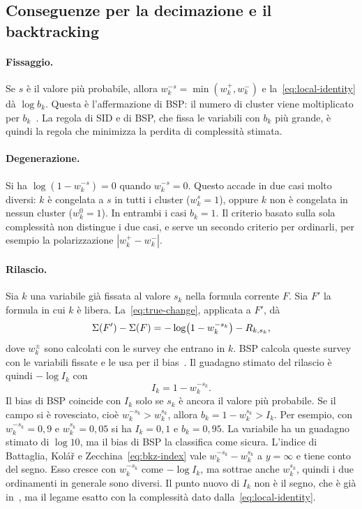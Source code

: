 \subsection{Conseguenze per la decimazione e il backtracking}

\paragraph{Fissaggio.}
Se $s$ è il valore più probabile, allora $w_k^{-s}=\min(w_k^+,w_k^-)$ e la~\eqref{eq:local-identity} dà $\log b_k$.
Questa è l'affermazione di BSP: il numero di cluster viene moltiplicato per $b_k$~\citep{marino2016bsp}.
La regola di SID e di BSP, che fissa le variabili con $b_k$ più grande, è quindi la regola che minimizza la perdita di complessità stimata.

\paragraph{Degenerazione.}
Si ha $\log(1-w_k^{-s})=0$ quando $w_k^{-s}=0$.
Questo accade in due casi molto diversi: $k$ è congelata a $s$ in tutti i cluster ($w_k^{s}=1$), oppure $k$ non è congelata in nessun cluster ($w_k^0=1$).
In entrambi i casi $b_k=1$.
Il criterio basato sulla sola complessità non distingue i due casi, e serve un secondo criterio per ordinarli, per esempio la polarizzazione $|w_k^+-w_k^-|$.

\paragraph{Rilascio.}
Sia $k$ una variabile già fissata al valore $s_k$ nella formula corrente $F$.
Sia $F'$ la formula in cui $k$ è libera.
La~\eqref{eq:true-change}, applicata a $F'$, dà
\begin{equation}
\Sigma(F')-\Sigma(F)=-\log\bigl(1-w_k^{-s_k}\bigr)-R_{k,s_k},
\label{eq:release}
\end{equation}
dove $w_k^{\pm}$ sono calcolati con le survey che entrano in $k$.
BSP calcola queste survey con le variabili fissate e le usa per il bias~\citep{marino2016bsp}.
Il guadagno stimato del rilascio è quindi $-\log I_k$ con
\begin{equation}
I_k=1-w_k^{-s_k}.
\label{eq:Ik}
\end{equation}
Il bias di BSP coincide con $I_k$ solo se $s_k$ è ancora il valore più probabile.
Se il campo si è rovesciato, cioè $w_k^{-s_k}>w_k^{s_k}$, allora $b_k=1-w_k^{s_k}>I_k$.
Per esempio, con $w_k^{-s_k}=0{,}9$ e $w_k^{s_k}=0{,}05$ si ha $I_k=0{,}1$ e $b_k=0{,}95$.
La variabile ha un guadagno stimato di $\log10$, ma il bias di BSP la classifica come sicura.
L'indice di Battaglia, Kolář e Zecchina~\eqref{eq:bkz-index} vale $w_k^{-s_k}-w_k^{s_k}$ a $y=\infty$ e tiene conto del segno.
Esso cresce con $w_k^{-s_k}$ come $-\log I_k$, ma sottrae anche $w_k^{s_k}$, quindi i due ordinamenti in generale sono diversi.
Il punto nuovo di $I_k$ non è il segno, che è già in~\citep{battaglia2004minimizing}, ma il legame esatto con la complessità dato dalla~\eqref{eq:local-identity}.

